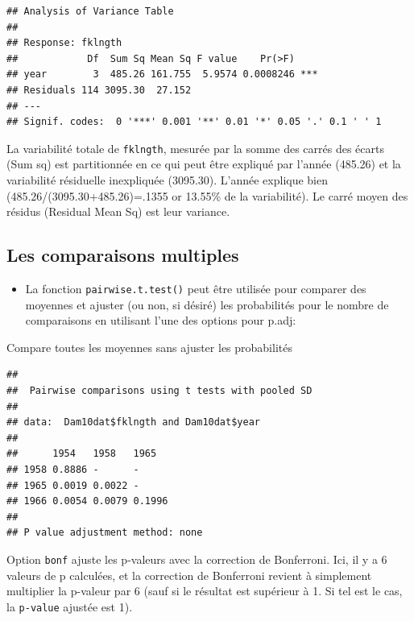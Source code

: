 \documentclass[12pt,]{book}
\newenvironment{Shaded}{\begin{snugshade}}{\end{snugshade}}
\newcommand{\DataTypeTok}[1]{\textcolor[rgb]{0.27,0.27,0.27}{#1}}
\newcommand{\KeywordTok}[1]{\textcolor[rgb]{0.27,0.27,0.27}{\textbf{#1}}}
\newcommand{\NormalTok}[1]{#1}
\newcommand{\OperatorTok}[1]{\textcolor[rgb]{0.43,0.43,0.43}{\textbf{#1}}}
\newcommand{\StringTok}[1]{\textcolor[rgb]{0.5,0.5,0.5}{#1}}
\providecommand{\tightlist}{%
  \setlength{\itemsep}{0pt}\setlength{\parskip}{0pt}}
\begin{document}
\begin{verbatim}
## Analysis of Variance Table
## 
## Response: fklngth
##            Df  Sum Sq Mean Sq F value    Pr(>F)    
## year        3  485.26 161.755  5.9574 0.0008246 ***
## Residuals 114 3095.30  27.152                      
## ---
## Signif. codes:  0 '***' 0.001 '**' 0.01 '*' 0.05 '.' 0.1 ' ' 1
\end{verbatim}

La variabilité totale de \texttt{fklngth}, mesurée par la somme des carrés des écarts (Sum sq) est partitionnée en ce qui peut être expliqué par l'année (485.26) et la variabilité résiduelle inexpliquée (3095.30). L'année explique bien (485.26/(3095.30+485.26)=.1355 or 13.55\% de la variabilité). Le carré moyen des résidus (Residual Mean Sq) est leur variance.

\hypertarget{les-comparaisons-multiples}{%
\subsection{Les comparaisons multiples}\label{les-comparaisons-multiples}}

\begin{itemize}
\tightlist
\item
  La fonction \texttt{pairwise.t.test()} peut être utilisée pour comparer des moyennes et ajuster (ou non, si désiré) les probabilités pour le nombre de comparaisons en utilisant l'une des options pour p.adj:
\end{itemize}

Compare toutes les moyennes sans ajuster les probabilités

\begin{Shaded}
\end{Shaded}

\begin{verbatim}
## 
## 	Pairwise comparisons using t tests with pooled SD 
## 
## data:  Dam10dat$fklngth and Dam10dat$year 
## 
##      1954   1958   1965  
## 1958 0.8886 -      -     
## 1965 0.0019 0.0022 -     
## 1966 0.0054 0.0079 0.1996
## 
## P value adjustment method: none
\end{verbatim}

Option \texttt{bonf} ajuste les p-valeurs avec la correction de Bonferroni. Ici, il y a 6 valeurs de p calculées, et la correction de Bonferroni revient à simplement multiplier la p-valeur par 6 (sauf si le résultat est supérieur à 1. Si tel est le cas, la \texttt{p-value} ajustée est 1).
\end{document}

